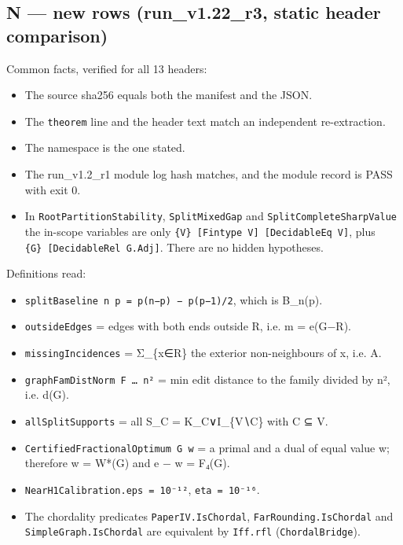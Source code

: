 \documentclass[
]{article}
\providecommand{\tightlist}{%
  \setlength{\itemsep}{0pt}\setlength{\parskip}{0pt}}
\begin{document}
\subsection{N --- new rows (run\_v1.22\_r3, static header
comparison)}\label{n--new-rows-run_v122_r3-static-header-comparison}

Common facts, verified for all 13 headers:

\begin{itemize}
\tightlist
\item
  The source sha256 equals both the manifest and the JSON.
\item
  The \texttt{theorem} line and the header text match an independent
  re-extraction.
\item
  The namespace is the one stated.
\item
  The run\_v1.2\_r1 module log hash matches, and the module record is
  PASS with exit 0.
\item
  In \texttt{RootPartitionStability}, \texttt{SplitMixedGap} and
  \texttt{SplitCompleteSharpValue} the in-scope variables are only
  \texttt{\{V\}\ {[}Fintype\ V{]}\ {[}DecidableEq\ V{]}}, plus
  \texttt{\{G\}\ {[}DecidableRel\ G.Adj{]}}. There are no hidden
  hypotheses.
\end{itemize}

Definitions read:

\begin{itemize}
\tightlist
\item
  \texttt{splitBaseline\ n\ p\ =\ p(n−p)\ −\ p(p−1)/2}, which is
  B\_n(p).
\item
  \texttt{outsideEdges} = edges with both ends outside R, i.e. m =
  e(G−R).
\item
  \texttt{missingIncidences} = Σ\_\{x∈R\} the exterior non-neighbours of
  x, i.e. A.
\item
  \texttt{graphFamDistNorm\ F\ …\ n²} = min edit distance to the family
  divided by n², i.e. d(G).
\item
  \texttt{allSplitSupports} = all S\_C = K\_C∨I\_\{V∖C\} with C ⊆ V.
\item
  \texttt{CertifiedFractionalOptimum\ G\ w} = a primal and a dual of
  equal value w; therefore w = W*(G) and e − w = F₄(G).
\item
  \texttt{NearH1Calibration.eps\ =\ 10⁻¹²}, \texttt{eta\ =\ 10⁻¹⁶}.
\item
  The chordality predicates \texttt{PaperIV.IsChordal},
  \texttt{FarRounding.IsChordal} and \texttt{SimpleGraph.IsChordal} are
  equivalent by \texttt{Iff.rfl} (\texttt{ChordalBridge}).
\end{itemize}
\end{document}
